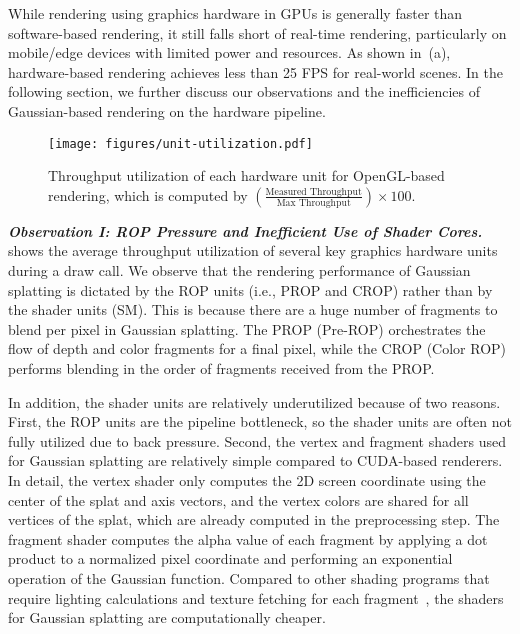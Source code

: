 While rendering using graphics hardware in GPUs is generally faster than
software-based rendering, it still falls short of real-time rendering,
particularly on mobile/edge devices with limited power and resources. 
%
As shown in~(a), hardware-based rendering achieves less
than 25 FPS for real-world scenes.
%
In the following section, we further discuss our observations and the
inefficiencies of Gaussian-based rendering on the hardware pipeline.


\begin{figure}[t]
  \centering
  \texttt{[image: figures/unit-utilization.pdf]}
  \caption{
%
    Throughput utilization of each hardware unit for OpenGL-based rendering, which is computed by $(\frac{\textrm{Measured
    Throughput}}{\textrm{Max Throughput}}){\times}100$. 
%
  }
  \vspace{-0.20in}
  \label{fig:unit-utilization}
\end{figure}

\textbf{\textit{Observation I: ROP Pressure and Inefficient Use of Shader
Cores.}}
%
 shows the average throughput utilization of several
key graphics hardware units during a draw call.
%
We observe that the rendering performance of Gaussian splatting is dictated by
the ROP units (i.e., PROP and CROP) rather than by the shader units (SM).
%
This is because there are a huge number of fragments to blend per pixel in
Gaussian splatting.
%
The PROP (Pre-ROP) orchestrates the flow of depth and color fragments for a
final pixel, while the CROP (Color ROP) performs blending in the order of
fragments received from the PROP.

In addition, the shader units are relatively underutilized because of two reasons.
First, the ROP units are the pipeline bottleneck, so the shader units are often
not fully utilized due to back pressure. Second, the vertex and fragment
shaders used for Gaussian splatting are relatively simple compared to
CUDA-based renderers. In detail, the vertex shader only computes the 2D screen
coordinate using the center of the splat and axis vectors, and the vertex
colors are shared for all vertices of the splat, which are already computed in
the preprocessing step. 
%
The fragment shader computes the alpha value of each fragment by applying a dot
product to a normalized pixel coordinate and performing an exponential
operation of the Gaussian function.
%
Compared to other shading programs that require lighting calculations and
texture fetching for each fragment~\cite{kru:wes03}, the shaders for Gaussian
splatting are computationally cheaper.


